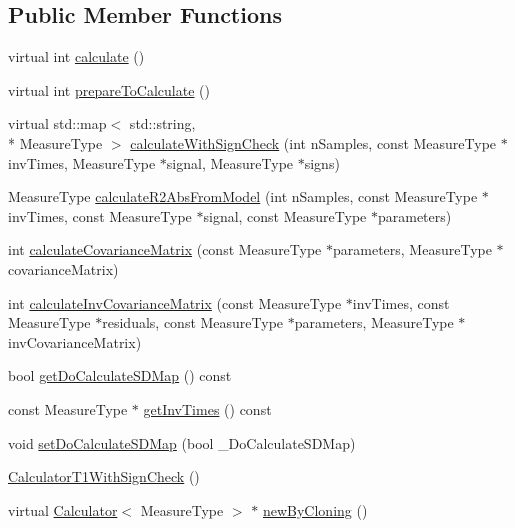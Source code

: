 \subsection*{Public Member Functions}
\begin{DoxyCompactItemize}
\item 
virtual int \hyperlink{class_ox_1_1_calculator_t1_with_sign_check_ae5b9cb33d60b5c4d96f8890b3ca991c4}{calculate} ()
\item 
virtual int \hyperlink{class_ox_1_1_calculator_t1_with_sign_check_ad93dba810e34daf87ac35839cb0ff671}{prepare\-To\-Calculate} ()
\item 
virtual std\-::map$<$ std\-::string, \\*
Measure\-Type $>$ \hyperlink{class_ox_1_1_calculator_t1_with_sign_check_af6f5e9b8fabb1a71ace382c33621d779}{calculate\-With\-Sign\-Check} (int n\-Samples, const Measure\-Type $\ast$inv\-Times, Measure\-Type $\ast$signal, Measure\-Type $\ast$signs)
\item 
Measure\-Type \hyperlink{class_ox_1_1_calculator_t1_with_sign_check_a08dfb14e6c69bbf05394512cd1f0ab9a}{calculate\-R2\-Abs\-From\-Model} (int n\-Samples, const Measure\-Type $\ast$inv\-Times, const Measure\-Type $\ast$signal, const Measure\-Type $\ast$parameters)
\item 
int \hyperlink{class_ox_1_1_calculator_t1_with_sign_check_a39d31020ec78a35ead3019a1f92f837a}{calculate\-Covariance\-Matrix} (const Measure\-Type $\ast$parameters, Measure\-Type $\ast$covariance\-Matrix)
\item 
int \hyperlink{class_ox_1_1_calculator_t1_with_sign_check_a5c17fcfc1ca0390052d98256f4a0bf62}{calculate\-Inv\-Covariance\-Matrix} (const Measure\-Type $\ast$inv\-Times, const Measure\-Type $\ast$residuals, const Measure\-Type $\ast$parameters, Measure\-Type $\ast$inv\-Covariance\-Matrix)
\item 
bool \hyperlink{class_ox_1_1_calculator_t1_with_sign_check_ab4a3d7795d055bc22b7da2db83c44e1f}{get\-Do\-Calculate\-S\-D\-Map} () const 
\item 
const Measure\-Type $\ast$ \hyperlink{class_ox_1_1_calculator_t1_with_sign_check_ab6cd6c2a3d32b153d78839230582c793}{get\-Inv\-Times} () const 
\item 
void \hyperlink{class_ox_1_1_calculator_t1_with_sign_check_a1e08ddf2db6d50734abbe015d1e796e1}{set\-Do\-Calculate\-S\-D\-Map} (bool \-\_\-\-Do\-Calculate\-S\-D\-Map)
\item 
\hyperlink{class_ox_1_1_calculator_t1_with_sign_check_a964319b777d2e4c703647208117aca3f}{Calculator\-T1\-With\-Sign\-Check} ()
\item 
virtual \hyperlink{class_ox_1_1_calculator}{Calculator}$<$ Measure\-Type $>$ $\ast$ \hyperlink{class_ox_1_1_calculator_t1_with_sign_check_a59e5be9935b9c235f4958a461fda081e}{new\-By\-Cloning} ()
\end{DoxyCompactItemize}
